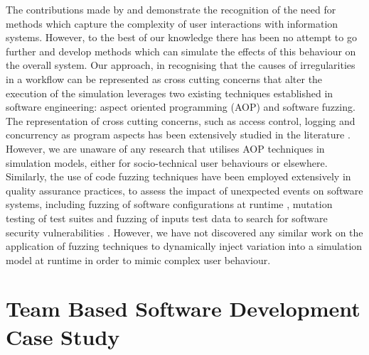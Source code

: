 \documentclass{llncs}
\begin{document}
The contributions made by \citet{herrmann1999vagueness} and \citet{sommerville09deriving} demonstrate the recognition of
the need for methods which capture the complexity of user interactions with information systems.  However, to the best
of our knowledge there has been no attempt to go further and develop methods which can simulate the effects of this
behaviour on the overall system.  Our approach, in recognising that the causes of irregularities in a workflow can be
represented as cross cutting concerns that alter the execution of the simulation leverages two existing techniques
established in software engineering: aspect oriented programming (AOP) and software fuzzing. The representation of cross
cutting concerns, such as access control, logging and concurrency as program aspects has been extensively studied in the
literature \citep{Ali2012Aspect}.  However, we are unaware of any research that utilises AOP techniques in simulation
models, either for socio-technical user behaviours or elsewhere.  Similarly, the use of code fuzzing techniques have
been employed extensively in quality assurance practices, to assess the impact of unexpected events on software systems,
including fuzzing of software configurations at runtime \citep{config_fuzzing}, mutation testing of test suites
\cite{demillo78hints} and fuzzing of inputs test data to search for software security vulnerabilities
\citep{takanen08fuzzing}.  However, we have not discovered any similar work on the application of fuzzing techniques to
dynamically inject variation into a simulation model at runtime in order to mimic complex user behaviour.


\section{Team Based Software Development Case Study}
\label{sec:case-study}

\end{document}
